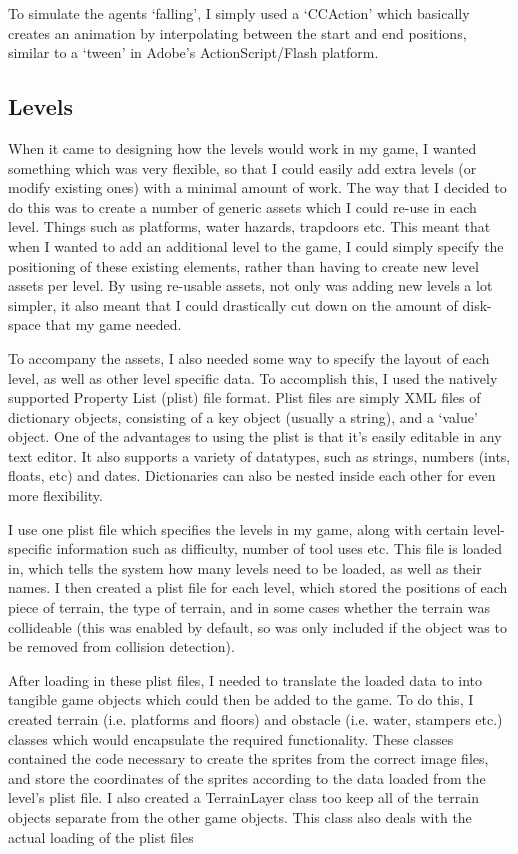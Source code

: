 \documentclass[a4paper,oneside]{report}
\begin{document}
To simulate the agents `falling', I simply used a `CCAction' which basically creates an animation by interpolating between the start and end positions, similar to a `tween' in Adobe's ActionScript/Flash platform. 

\subsection{Levels} 

When it came to designing how the levels would work in my game, I wanted something which was very flexible, so that I could easily add extra levels (or modify existing ones) with a minimal amount of work. The way that I decided to do this was to create a number of generic assets which I could re-use in each level. Things such as platforms, water hazards, trapdoors etc. This meant that when I wanted to add an additional level to the game, I could simply specify the positioning of these existing elements, rather than having to create new level assets per level. By using re-usable assets, not only was adding new levels a lot simpler, it also meant that I could drastically cut down on the amount of disk-space that my game needed.

To accompany the assets, I also needed some way to specify the layout of each level, as well as other level specific data. To accomplish this, I used the natively supported Property List (plist) file format. Plist files are simply XML files of dictionary objects, consisting of a key object (usually a string), and a `value' object. One of the advantages to using the plist is that it's easily editable in any text editor. It also supports a variety of datatypes, such as strings, numbers (ints, floats, etc) and dates. Dictionaries can also be nested inside each other for even more flexibility. 

I use one plist file which specifies the levels in my game, along with certain level-specific information such as difficulty, number of tool uses etc. This file is loaded in, which tells the system how many levels need to be loaded, as well as their names. I then created a plist file for each level, which stored the positions of each piece of terrain, the type of terrain, and in some cases whether the terrain was collideable (this was enabled by default, so was only included if the object was to be removed from collision detection).

After loading in these plist files, I needed to translate the loaded data to into tangible game objects which could then be added to the game. To do this, I created terrain (i.e. platforms and floors) and obstacle (i.e. water, stampers etc.) classes which would encapsulate the required functionality. These classes contained the code necessary to create the sprites from the correct image files, and store the coordinates of the sprites according to the data loaded from the level's plist file. I also created a TerrainLayer class too keep all of the terrain objects separate from the other game objects. This class also deals with the actual loading of the plist files
\end{document}
